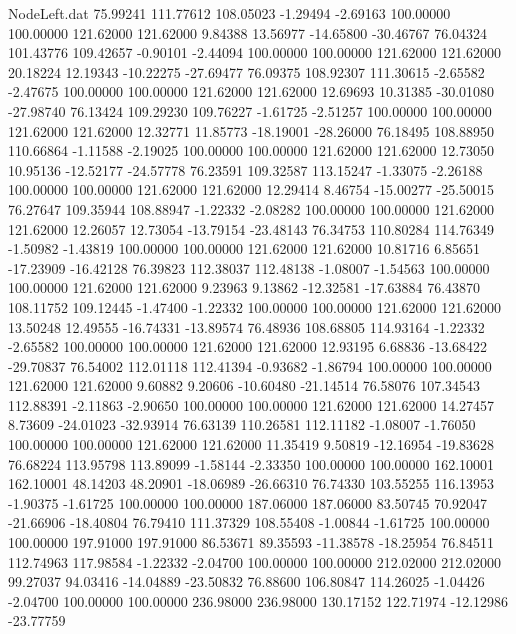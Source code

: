 \begin{filecontents}{NodeLeft.dat}
  75.99241  111.77612  108.05023    -1.29494   -2.69163  100.00000  100.00000  121.62000  121.62000    9.84388   13.56977  -14.65800  -30.46767
  76.04324  101.43776  109.42657    -0.90101   -2.44094  100.00000  100.00000  121.62000  121.62000   20.18224   12.19343  -10.22275  -27.69477
  76.09375  108.92307  111.30615    -2.65582   -2.47675  100.00000  100.00000  121.62000  121.62000   12.69693   10.31385  -30.01080  -27.98740
  76.13424  109.29230  109.76227    -1.61725   -2.51257  100.00000  100.00000  121.62000  121.62000   12.32771   11.85773  -18.19001  -28.26000
  76.18495  108.88950  110.66864    -1.11588   -2.19025  100.00000  100.00000  121.62000  121.62000   12.73050   10.95136  -12.52177  -24.57778
  76.23591  109.32587  113.15247    -1.33075   -2.26188  100.00000  100.00000  121.62000  121.62000   12.29414    8.46754  -15.00277  -25.50015
  76.27647  109.35944  108.88947    -1.22332   -2.08282  100.00000  100.00000  121.62000  121.62000   12.26057   12.73054  -13.79154  -23.48143
  76.34753  110.80284  114.76349    -1.50982   -1.43819  100.00000  100.00000  121.62000  121.62000   10.81716    6.85651  -17.23909  -16.42128
  76.39823  112.38037  112.48138    -1.08007   -1.54563  100.00000  100.00000  121.62000  121.62000    9.23963    9.13862  -12.32581  -17.63884
  76.43870  108.11752  109.12445    -1.47400   -1.22332  100.00000  100.00000  121.62000  121.62000   13.50248   12.49555  -16.74331  -13.89574
  76.48936  108.68805  114.93164    -1.22332   -2.65582  100.00000  100.00000  121.62000  121.62000   12.93195    6.68836  -13.68422  -29.70837
  76.54002  112.01118  112.41394    -0.93682   -1.86794  100.00000  100.00000  121.62000  121.62000    9.60882    9.20606  -10.60480  -21.14514
  76.58076  107.34543  112.88391    -2.11863   -2.90650  100.00000  100.00000  121.62000  121.62000   14.27457    8.73609  -24.01023  -32.93914
  76.63139  110.26581  112.11182    -1.08007   -1.76050  100.00000  100.00000  121.62000  121.62000   11.35419    9.50819  -12.16954  -19.83628
  76.68224  113.95798  113.89099    -1.58144   -2.33350  100.00000  100.00000  162.10001  162.10001   48.14203   48.20901  -18.06989  -26.66310
  76.74330  103.55255  116.13953    -1.90375   -1.61725  100.00000  100.00000  187.06000  187.06000   83.50745   70.92047  -21.66906  -18.40804
  76.79410  111.37329  108.55408    -1.00844   -1.61725  100.00000  100.00000  197.91000  197.91000   86.53671   89.35593  -11.38578  -18.25954
  76.84511  112.74963  117.98584    -1.22332   -2.04700  100.00000  100.00000  212.02000  212.02000   99.27037   94.03416  -14.04889  -23.50832
  76.88600  106.80847  114.26025    -1.04426   -2.04700  100.00000  100.00000  236.98000  236.98000  130.17152  122.71974  -12.12986  -23.77759

\end{filecontents}
